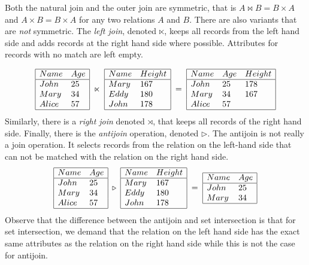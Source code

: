 Both the natural join and the outer join are symmetric, that is $A\bowtie
B=B\times A$ and $A\times B=B\times A$ for any two relations $A$ and $B$. There
are also variants that are \emph{not} symmetric. The \emph{left join}, denoted
$\ltimes$, keeps all records from the left hand side and adds records at the
right hand side where possible. Attributes for records with no match are left
empty.

$$
\begin{array}{|ll|}
\hline
Name & Age\\
\hline
John  & 25\\
Mary  & 34\\
Alice & 57\\
\hline
\end{array}
\;\ltimes\;
\begin{array}{|ll|}
\hline
Name & Height\\
\hline
Mary & 167\\
Eddy & 180\\
John & 178\\
\hline
\end{array}
\;=\;
\begin{array}{|lll|}
\hline
Name & Age & Height\\
\hline
John & 25 & 178 \\
Mary & 34 & 167 \\
Alice& 57 &     \\
\hline
\end{array}
$$
Similarly, there is a \emph{right join} denoted $\rtimes$, that keeps all
records of the right hand side. Finally, there is the \emph{antijoin}
operation, denoted $\triangleright$. The antijoin is not really a join
operation. It selects records from the relation on the left-hand side that can
not be matched with the relation on the right hand side.
$$
\begin{array}{|ll|}
\hline
Name & Age\\
\hline
John  & 25\\
Mary  & 34\\
Alice & 57\\
\hline
\end{array}
\;\triangleright\;
\begin{array}{|ll|}
\hline
Name & Height\\
\hline
Mary & 167\\
Eddy & 180\\
John & 178\\
\hline
\end{array}
\;=\;
\begin{array}{|ll|}
\hline
Name & Age\\
\hline
John  & 25\\
Mary  & 34\\
\hline
\end{array}
$$
Observe that the difference between the antijoin and set intersection is that
for set intersection, we demand that the relation on the left hand side has
the exact same attributes as the relation on the right hand side while
this is not the case for antijoin.

